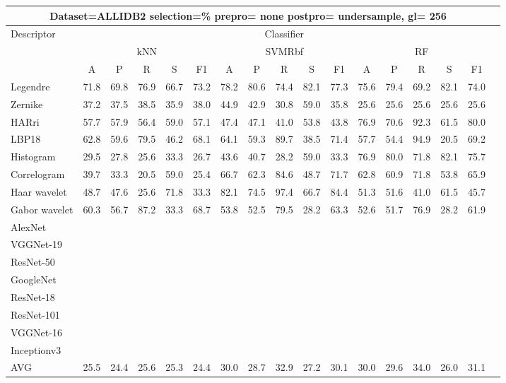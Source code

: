 \documentclass[12pt,italian]{article}
\begin{document}
\begin{tiny}
\begin{longtable}{lcccccccccccccccc}
\toprule
\multicolumn{16}{c}{Dataset=ALLIDB2 selection=\% prepro= none postpro= undersample, gl= 256} \\ 
\toprule
Descriptor & \multicolumn{15}{c}{Classifier} \\ 
& \multicolumn{5}{c}{kNN} & \multicolumn{5}{c}{SVMRbf} & \multicolumn{5}{c}{RF} \\ 
& A & P & R & S & F1 & A & P & R & S & F1 & A & P & R & S & F1 \\ 
\midrule
Legendre & 71.8 & 69.8 & 76.9 & 66.7 & 73.2 & 78.2 & 80.6 & 74.4 & 82.1 & 77.3 & 75.6 & 79.4 & 69.2 & 82.1 & 74.0 \\ 
Zernike & 37.2 & 37.5 & 38.5 & 35.9 & 38.0 & 44.9 & 42.9 & 30.8 & 59.0 & 35.8 & 25.6 & 25.6 & 25.6 & 25.6 & 25.6 \\ 
HARri & 57.7 & 57.9 & 56.4 & 59.0 & 57.1 & 47.4 & 47.1 & 41.0 & 53.8 & 43.8 & 76.9 & 70.6 & 92.3 & 61.5 & 80.0 \\ 
LBP18 & 62.8 & 59.6 & 79.5 & 46.2 & 68.1 & 64.1 & 59.3 & 89.7 & 38.5 & 71.4 & 57.7 & 54.4 & 94.9 & 20.5 & 69.2 \\ 
Histogram & 29.5 & 27.8 & 25.6 & 33.3 & 26.7 & 43.6 & 40.7 & 28.2 & 59.0 & 33.3 & 76.9 & 80.0 & 71.8 & 82.1 & 75.7 \\ 
Correlogram & 39.7 & 33.3 & 20.5 & 59.0 & 25.4 & 66.7 & 62.3 & 84.6 & 48.7 & 71.7 & 62.8 & 60.9 & 71.8 & 53.8 & 65.9 \\ 
Haar wavelet & 48.7 & 47.6 & 25.6 & 71.8 & 33.3 & 82.1 & 74.5 & 97.4 & 66.7 & 84.4 & 51.3 & 51.6 & 41.0 & 61.5 & 45.7 \\ 
Gabor wavelet & 60.3 & 56.7 & 87.2 & 33.3 & 68.7 & 53.8 & 52.5 & 79.5 & 28.2 & 63.3 & 52.6 & 51.7 & 76.9 & 28.2 & 61.9 \\ 
AlexNet \\ 
VGGNet-19 \\ 
ResNet-50 \\ 
GoogleNet \\ 
ResNet-18 \\ 
ResNet-101 \\ 
VGGNet-16 \\ 
Inceptionv3 \\ 
\hline
AVG & 25.5 & 24.4 & 25.6 & 25.3 & 24.4 & 30.0 & 28.7 & 32.9 & 27.2 & 30.1 & 30.0 & 29.6 & 34.0 & 26.0 & 31.1 \\ 
\hline
\bottomrule
\end{longtable} 


\end{tiny}
\end{document}
